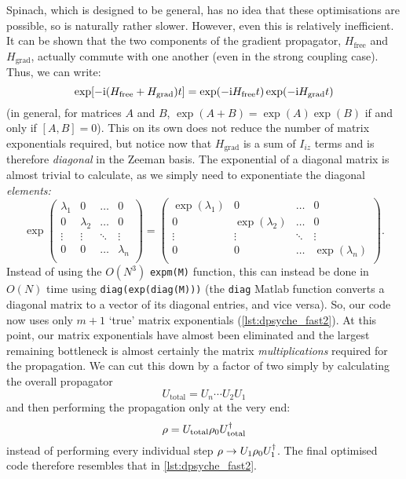 Spinach, which is designed to be general, has no idea that these optimisations are possible, so is naturally rather slower.
However, even this is relatively inefficient.
It can be shown that the two components of the gradient propagator, $H_\text{free}$ and $H_\text{grad}$, actually commute with one another (even in the strong coupling case).
Thus, we can write:
\begin{equation}
    \label{eq:split_propagator}
    \exp[-\mathrm{i}(H_\text{free} + H_\text{grad}) t] = \exp(-\mathrm{i} H_\text{free} t) \exp(-\mathrm{i} H_\text{grad} t)
\end{equation}
(in general, for matrices $A$ and $B$, $\exp(A + B) = \exp(A)\exp(B)$ if and only if $[A, B] = 0$).
This on its own does not reduce the number of matrix exponentials required, but notice now that $H_\text{grad}$ is a sum of $I_{iz}$ terms and is therefore \textit{diagonal} in the Zeeman basis.
The exponential of a diagonal matrix is almost trivial to calculate, as we simply need to exponentiate the diagonal \textit{elements:}
\begin{equation}
    \label{eq:expm_diagonal}
    \exp
    \begin{pmatrix}
        \lambda_1 & 0 & \ldots & 0 \\
        0 & \lambda_2 & \ldots & 0 \\
        \vdots & \vdots & \ddots & \vdots \\
        0 & 0 & \ldots & \lambda_n \\
    \end{pmatrix}
    = 
    \begin{pmatrix}
        \exp(\lambda_1) & 0 & \ldots & 0 \\
        0 & \exp(\lambda_2) & \ldots & 0 \\
        \vdots & \vdots & \ddots & \vdots \\
        0 & 0 & \ldots & \exp(\lambda_n) \\
    \end{pmatrix}.
\end{equation}
Instead of using the $O(N^3)$ \texttt{expm(M)} function, this can instead be done in $O(N)$ time using \texttt{diag(exp(diag(M)))} (the \texttt{diag} Matlab function converts a diagonal matrix to a vector of its diagonal entries, and vice versa).
So, our code now uses only $m + 1$ `true' matrix exponentials (\cref{lst:dpsyche_fast2}).
At this point, our matrix exponentials have almost been eliminated and the largest remaining bottleneck is almost certainly the matrix \textit{multiplications} required for the propagation.
We can cut this down by a factor of two simply by calculating the overall propagator
\begin{equation}
    \label{eq:overall_propagator}
    U_\text{total} = U_n\cdots U_2U_1
\end{equation}
and then performing the propagation only at the very end:
\begin{equation}
    \label{eq:overall_propagation}
    \rho = U_\text{total} \rho_0 U_\text{total}^\dagger
\end{equation}
instead of performing every individual step $\rho \to U_1\rho_0U_1^\dagger$.
The final optimised code therefore resembles that in \cref{lst:dpsyche_fast2}.

